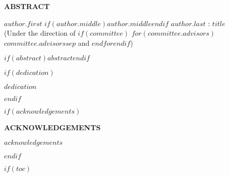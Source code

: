 \documentclass[$if(fontsize)$$fontsize$,$endif$,letterpaper,twoside]{report}
\begin{document}
\begin{center}
\vspace*{52pt}
{\Large \textbf{ABSTRACT}}
\vspace{11pt}

\begin{singlespace}
 $author.first$ $if(author.middle)$$author.middle$$endif$ $author.last$ : $title$ \\
(Under the direction of $if(committee)$ $for(committee.advisors)$ $committee.advisors$$sep$ and $endfor$$endif$)
\end{singlespace}
\end{center}

$if(abstract)$$abstract$$endif$

\clearpage


$if(dedication)$
\begin{center}
\vspace*{52pt}

\singlespacing

$dedication$

\end{center}

\pagebreak
$endif$


$if(acknowledgements)$
\begin{center}
\vspace*{52pt}
{\Large \textbf{ACKNOWLEDGEMENTS}}
\end{center}

$acknowledgements$

\clearpage
$endif$


$if(toc)$
\renewcommand{\contentsname}{TABLE OF CONTENTS}
\renewcommand{\cfttoctitlefont}{\Large\bfseries}
\renewcommand{\cftaftertoctitle}{\hfill}
\renewcommand{\cftdotsep}{1.5}
\cftsetrmarg{1.0in}
\end{document}
